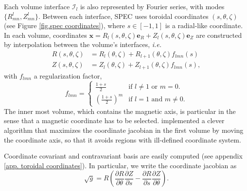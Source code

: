 \documentclass[my_thesis.tex]{subfiles}
\begin{document}
Each volume interface $\mathcal{I}_l$ is also represented by Fourier series, with modes $\{R^l_{mn},Z^l_{mn}\}$. Between each interface, SPEC uses toroidal coordinates $(s,\theta,\zeta)$ (see Figure \ref{fig.spec coordinates}), where $s\in[-1,1]$ is a radial-like coordinate. In each volume, coordinates $\mathbf{x}=R_l(s,\theta,\zeta)\mathbf{e}_R+Z_l(s,\theta,\zeta)\mathbf{e}_Z$ are constructed by interpolation between the volume's interfaces, \textit{i.e.}
\begin{align}
	R(s,\theta,\zeta) &= {R}_l(\theta,\zeta) + {R}_{l+1}(\theta,\zeta)f_{lmn}(s)\label{eq.Rmns}\\
	Z(s,\theta,\zeta) &= {Z}_l(\theta,\zeta) + {Z}_{l+1}(\theta,\zeta)f_{lmn}(s),\label{eq.Zmns}
\end{align}
with $f_{lmn}$ a regularization factor, 
\begin{equation}
	f_{lmn} = \left\{\begin{array}{ll}
	\frac{1+s}{2} & \text{if } l\ne 1 \text{ or } m=0.\\
	\left(\frac{1+s}{2}\right)^m & \text{if } l=1 \text{ and } m\ne0.
	\end{array}\right.
\end{equation}
The inner most volume, which contains the magnetic axis, is particular in the sense that a magnetic coordinate has to be selected. \citet{Qu2020} implemented a clever algorithm that maximizes the coordinate jacobian in the first volume by moving the coordinate axis, so that it avoids regions with ill-defined coordinate system.

Coordinate covariant and contravariant basis are easily computed (see appendix \ref{app. toroidal coordinates}). In particular, we write the coordinate jacobian as
\begin{equation}
	\sqrt{g} = R\left(\frac{\partial R}{\partial \theta}\frac{\partial Z}{\partial s}-\frac{\partial R}{\partial s}\frac{\partial Z}{\partial \theta}\right).
\end{equation}
\end{document}

